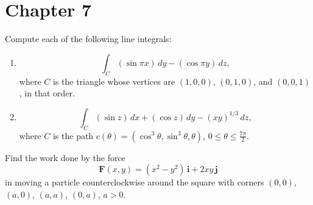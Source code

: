 \documentclass[openany]{book}
\begin{document}
\section{Chapter 7}

\begin{prob}[3]
    Compute each of the following line integrals:
    \begin{enumerate}
        \item[(a)] 
        \[
        \int_C (\sin \pi x) \, dy - (\cos \pi y) \, dz,
        \]
        where \( C \) is the triangle whose vertices are \((1, 0, 0)\), \((0, 1, 0)\), and \((0, 0, 1)\), in that order.
    
        \item[(b)]
        \[
        \int_C (\sin z) \, dx + (\cos z) \, dy - (xy)^{1/3} \, dz,
        \]
        where \( C \) is the path \( c(\theta) = (\cos^3 \theta, \sin^3 \theta, \theta) \), \( 0 \leq \theta \leq \frac{7\pi}{2} \).
    \end{enumerate}
\end{prob}

\begin{prob}[5]
    Find the work done by the force  
    \[
    \mathbf{F}(x, y) = (x^2 - y^2)\,\mathbf{i} + 2xy\,\mathbf{j}
    \]
    in moving a particle counterclockwise around the square with corners \((0, 0)\), \((a, 0)\), \((a, a)\), \((0, a)\), \(a > 0\).
\end{prob}
\end{document}
